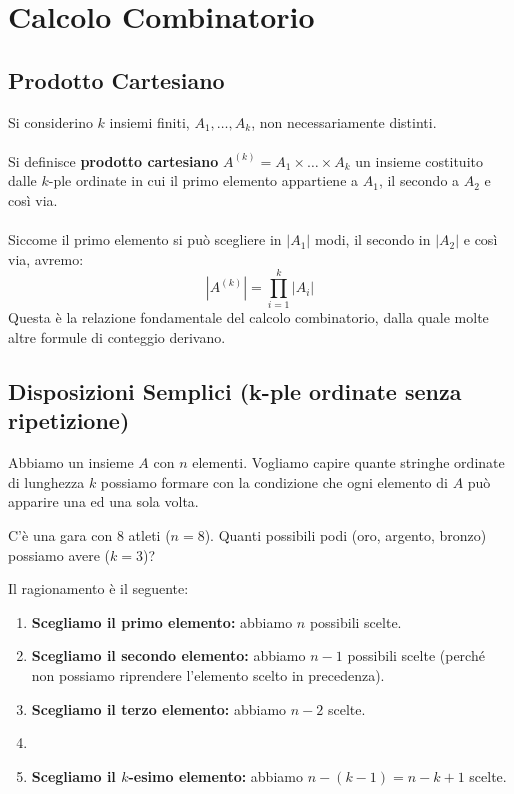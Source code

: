 
\clearpage
\section{Calcolo Combinatorio}
\subsection{Prodotto Cartesiano}

Si considerino $k$ insiemi finiti, $A_1, \dots, A_k$, non necessariamente distinti.
\\\\Si definisce \textbf{prodotto cartesiano} $A^{(k)} = A_1 \times \dots \times A_k$ un insieme costituito dalle $k$-ple ordinate in cui il primo elemento appartiene a $A_1$, il secondo a $A_2$ e così via.
\\\\Siccome il primo elemento si può scegliere in $|A_1|$ modi, il secondo in $|A_2|$ e così via, avremo:
    \[
    |A^{(k)}| = \prod_{i=1}^{k} |A_i|
    \]
Questa è la relazione fondamentale del calcolo combinatorio, dalla quale molte altre formule di conteggio derivano.

\subsection{Disposizioni Semplici (k-ple ordinate senza ripetizione)}

Abbiamo un insieme $A$ con $n$ elementi. Vogliamo capire quante stringhe ordinate di lunghezza $k$ possiamo formare con la condizione che ogni elemento di $A$ può apparire una ed una sola volta.

\begin{esempio}
	C'è una gara con 8 atleti ($n=8$). Quanti possibili podi (oro, argento, bronzo) possiamo avere ($k=3$)?
\end{esempio}

Il ragionamento è il seguente:
\begin{enumerate}
	\item \textbf{Scegliamo il primo elemento:} abbiamo $n$ possibili scelte.
	\item \textbf{Scegliamo il secondo elemento:} abbiamo $n-1$ possibili scelte (perché non possiamo riprendere l'elemento scelto in precedenza).
	\item \textbf{Scegliamo il terzo elemento:} abbiamo $n-2$ scelte.
	\item[\dots]
	\item \textbf{Scegliamo il $k$-esimo elemento:} abbiamo $n - (k-1) = n - k + 1$ scelte.
\end{enumerate}

